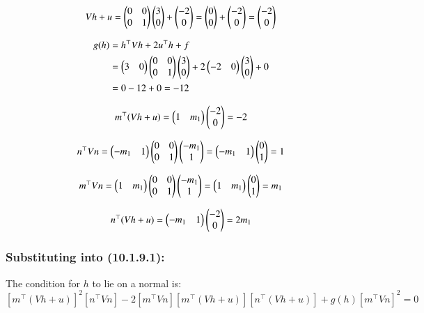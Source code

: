 \documentclass[article]{IEEEtran}
\begin{document}
\begin{equation}
	Vh + u = \begin{pmatrix}0 & 0\\0 & 1\end{pmatrix}\begin{pmatrix}3\\0\end{pmatrix} + \begin{pmatrix}-2\\0\end{pmatrix} = \begin{pmatrix}0\\0\end{pmatrix} + \begin{pmatrix}-2\\0\end{pmatrix} = \begin{pmatrix}-2\\0\end{pmatrix}
\end{equation}

\begin{equation}
	\begin{aligned}
		g(h) &= h^\top Vh + 2u^\top h + f \\
		&= \begin{pmatrix}3 & 0\end{pmatrix}\begin{pmatrix}0 & 0\\0 & 1\end{pmatrix}\begin{pmatrix}3\\0\end{pmatrix} + 2\begin{pmatrix}-2 & 0\end{pmatrix}\begin{pmatrix}3\\0\end{pmatrix} + 0\\
		&= 0 - 12 + 0 = -12
	\end{aligned}
\end{equation}

\begin{equation}
	m^\top(Vh + u) = \begin{pmatrix}1 & m_1\end{pmatrix}\begin{pmatrix}-2\\0\end{pmatrix} = -2
\end{equation}

\begin{equation}
	n^\top Vn = \begin{pmatrix}-m_1 & 1\end{pmatrix}\begin{pmatrix}0 & 0\\0 & 1\end{pmatrix}\begin{pmatrix}-m_1\\1\end{pmatrix} = \begin{pmatrix}-m_1 & 1\end{pmatrix}\begin{pmatrix}0\\1\end{pmatrix} = 1
\end{equation}

\begin{equation}
	m^\top Vn = \begin{pmatrix}1 & m_1\end{pmatrix}\begin{pmatrix}0 & 0\\0 & 1\end{pmatrix}\begin{pmatrix}-m_1\\1\end{pmatrix} = \begin{pmatrix}1 & m_1\end{pmatrix}\begin{pmatrix}0\\1\end{pmatrix} = m_1
\end{equation}

\begin{equation}
	n^\top(Vh + u) = \begin{pmatrix}-m_1 & 1\end{pmatrix}\begin{pmatrix}-2\\0\end{pmatrix} = 2m_1
\end{equation}

\subsubsection*{Substituting into (10.1.9.1):}

The condition for $h$ to lie on a normal is:
\begin{equation}
	\left[m^\top(Vh + u)\right]^2\left[n^\top Vn\right] - 2\left[m^\top Vn\right]\left[m^\top(Vh + u)\right]\left[n^\top(Vh + u)\right] + g(h)\left[m^\top Vn\right]^2 = 0
\end{equation}
\end{document}
